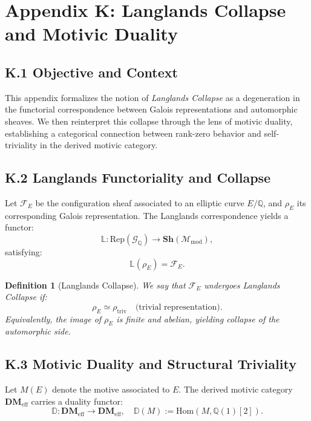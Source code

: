 \documentclass[11pt]{article}
\newtheorem{definition}[theorem]{Definition}
\begin{document}
\section*{Appendix K: Langlands Collapse and Motivic Duality}

\subsection*{K.1 Objective and Context}

This appendix formalizes the notion of \emph{Langlands Collapse} as a degeneration in the functorial correspondence between Galois representations and automorphic sheaves. We then reinterpret this collapse through the lens of motivic duality, establishing a categorical connection between rank-zero behavior and self-triviality in the derived motivic category.

\subsection*{K.2 Langlands Functoriality and Collapse}

Let \( \mathcal{F}_E \) be the configuration sheaf associated to an elliptic curve \( E/\mathbb{Q} \), and \( \rho_E \) its corresponding Galois representation. The Langlands correspondence yields a functor:
\[
\mathbb{L}: \mathrm{Rep}(\mathcal{G}_{\mathbb{Q}}) \longrightarrow \mathbf{Sh}(\mathcal{M}_{\mathrm{mod}}),
\]
satisfying:
\[
\mathbb{L}(\rho_E) = \mathcal{F}_E.
\]

\begin{definition}[Langlands Collapse]
We say that \( \mathcal{F}_E \) undergoes \emph{Langlands Collapse} if:
\[
\rho_E \simeq \rho_{\mathrm{triv}} \quad \text{(trivial representation)}.
\]
Equivalently, the image of \( \rho_E \) is finite and abelian, yielding collapse of the automorphic side.
\end{definition}

\subsection*{K.3 Motivic Duality and Structural Triviality}

Let \( M(E) \) denote the motive associated to \( E \). The derived motivic category \( \mathbf{DM}_{\mathrm{eff}} \) carries a duality functor:
\[
\mathbb{D}: \mathbf{DM}_{\mathrm{eff}} \to \mathbf{DM}_{\mathrm{eff}},
\quad \mathbb{D}(M) := \mathrm{Hom}(M, \mathbb{Q}(1)[2]).
\]
\end{document}
